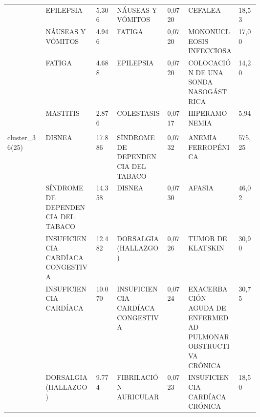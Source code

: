 \begin{landscape}
\begin{longtable}[c]{@{}lp{0.2\linewidth}lp{0.2\linewidth}lp{0.2\linewidth}l@{}}
                                  & EPILEPSIA                                                     & 5.306  & NÁUSEAS Y VÓMITOS                                      & 0,0720 & CEFALEA                                                       & 18,53    \\
                                  & NÁUSEAS Y VÓMITOS                                             & 4.946  & FATIGA                                                 & 0,0720 & MONONUCLEOSIS INFECCIOSA                                      & 17,00    \\
                                  & FATIGA                                                        & 4.688  & EPILEPSIA                                              & 0,0720 & COLOCACIÓN DE UNA SONDA NASOGÁSTRICA                          & 14,20    \\
                                  & MASTITIS                                                      & 2.876  & COLESTASIS                                             & 0,0717 & HIPERAMONEMIA                                                 & 5,94     \\ \\
\multirow{10}{*}{cluster\_36(25)} & DISNEA                                                        & 17.886 & SÍNDROME DE DEPENDENCIA DEL TABACO                     & 0,0732 & ANEMIA FERROPÉNICA                                            & 575,25   \\
                                  & SÍNDROME DE DEPENDENCIA DEL TABACO                            & 14.358 & DISNEA                                                 & 0,0730 & AFASIA                                                        & 46,02    \\
                                  & INSUFICIENCIA CARDÍACA CONGESTIVA                             & 12.482 & DORSALGIA (HALLAZGO)                                   & 0,0726 & TUMOR DE KLATSKIN                                             & 30,90    \\
                                  & INSUFICIENCIA CARDÍACA                                        & 10.070 & INSUFICIENCIA CARDÍACA CONGESTIVA                      & 0,0724 & EXACERBACIÓN AGUDA DE ENFERMEDAD PULMONAR OBSTRUCTIVA CRÓNICA & 30,75    \\
                                  & DORSALGIA (HALLAZGO)                                          & 9.774  & FIBRILACIÓN AURICULAR                                  & 0,0723 & INSUFICIENCIA CARDÍACA CRÓNICA                                & 18,50    \\

\end{longtable}
\end{landscape}
